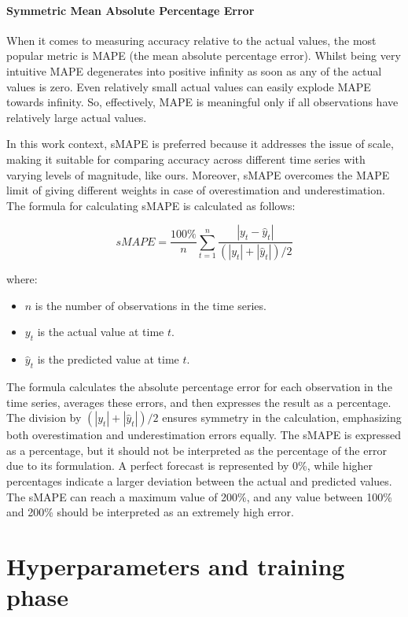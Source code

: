\paragraph{Symmetric Mean Absolute Percentage Error}
When it comes to measuring accuracy relative to the actual values, the most
popular metric is MAPE (the mean absolute percentage error). Whilst being very intuitive MAPE degenerates into positive infinity as soon as any of the actual values is zero. Even relatively small actual values can easily explode MAPE towards infinity. So, effectively, MAPE is meaningful only if all observations have relatively large actual values. 

In this work context, sMAPE is preferred because it addresses the issue of scale, making it suitable for comparing accuracy across different time series with varying levels of magnitude, like ours. Moreover, sMAPE overcomes the MAPE limit of giving different weights in case of overestimation and underestimation. The formula for calculating sMAPE is calculated as follows:

\begin{equation}
sMAPE = \frac{100\%}{n} \sum_{t=1}^{n} \frac{|y_t - \hat{y}_t|}{( |y_t| + |\hat{y}_t| ) / 2}
\end{equation}

where:
\begin{itemize}[noitemsep,  leftmargin=*]
  \item[] \( n \) is the number of observations in the time series.
  \item[] \( y_t \) is the actual value at time \( t \).
  \item[] \( \hat{y}_t \) is the predicted value at time \( t \).
\end{itemize}

The formula calculates the absolute percentage error for each observation in the time series, averages these errors, and then expresses the result as a percentage. The division by \( (|y_t| + |\hat{y}_t|) / 2 \) ensures symmetry in the calculation, emphasizing both overestimation and underestimation errors equally. The sMAPE is expressed as a percentage, but it should not be interpreted as the percentage of the error due to its formulation. A perfect forecast is represented by 0\%, while higher percentages indicate a larger deviation between the actual and predicted values. The sMAPE can reach a maximum value of 200\%, and any value between 100\% and 200\% should be interpreted as an extremely high error.

\section{Hyperparameters and training phase}

